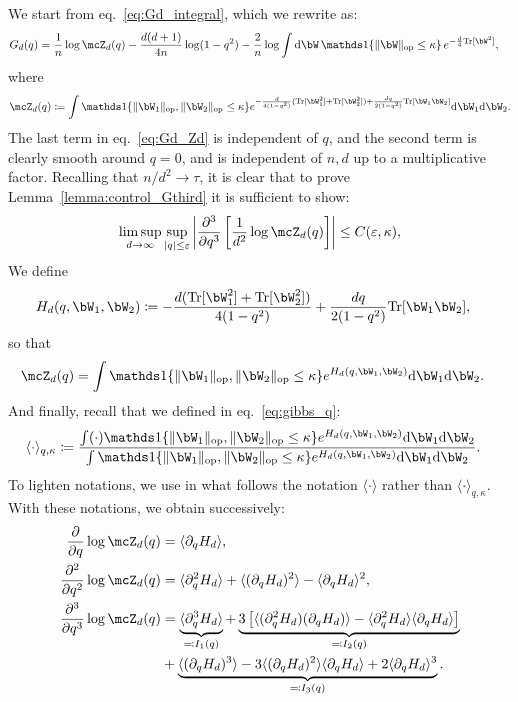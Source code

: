 We start from eq.~\eqref{eq:Gd_integral}, which we rewrite as:
\begin{align}\label{eq:Gd_Zd}
    G_d(q) &= \frac{1}{n} \log \mcZ_d(q) - \frac{d(d+1)}{4n} \log(1-q^2) - \frac{2}{n} \log \int \rd \bW \, \indi\{\|\bW \|_\op \leq \kappa\} \, e^{-\frac{d}{4}\Tr[\bW^2]},
\end{align}
where 
\begin{align}\label{eq:def_Zd}
    \mcZ_d(q) \coloneqq \int \indi\{\|\bW_1\|_\op, \|\bW_2\|_\op \leq \kappa\} e^{-\frac{d}{4(1-q^2)}(\Tr[\bW_1^2] + \Tr[\bW_2^2]) + \frac{dq}{2(1-q^2)} \Tr[\bW_1 \bW_2]} \rd \bW_1 \rd \bW_2.
\end{align}
The last term in eq.~\eqref{eq:Gd_Zd} is independent of $q$, and the second term is clearly smooth around $q = 0$, and is independent of $n,d$ up to a multiplicative factor.
Recalling that $n/d^2 \to \tau$, it is clear that to prove Lemma~\ref{lemma:control_Gthird} it is sufficient to show:
\begin{equation}\label{eq:to_show_Zd}
    \limsup_{d \to \infty} \sup_{|q| \leq \eps} \left| \frac{\partial^3}{\partial q^3}\left[ \frac{1}{d^2}\log \mcZ_d(q)\right]\right| \leq C(\eps, \kappa),
\end{equation}
We define 
\begin{align}\label{eq:def_Hd}
    H_d(q, \bW_1, \bW_2) &\coloneqq -\frac{d(\Tr[\bW_1^2] + \Tr[\bW_2^2])}{4(1-q^2)} + \frac{dq}{2(1-q^2)} \Tr[\bW_1 \bW_2],
\end{align}
so that
\begin{align*}
    \mcZ_d(q) &= \int \indi\{\|\bW_1\|_\op, \|\bW_2\|_\op \leq \kappa\} e^{H_d(q, \bW_1, \bW_2)} \rd \bW_1 \rd \bW_2.
\end{align*}
And finally, recall that we defined in eq.~\eqref{eq:gibbs_q}:
\begin{align*}
    \langle \cdot \rangle_{q,\kappa} &\coloneqq 
    \frac{\int (\cdot) \indi\{\|\bW_1\|_\op, \|\bW_2\|_\op \leq \kappa\} e^{H_d(q, \bW_1, \bW_2)} \rd \bW_1 \rd \bW_2}{\int \indi\{\|\bW_1\|_\op, \|\bW_2\|_\op \leq \kappa\} e^{H_d(q, \bW_1, \bW_2)} \rd \bW_1 \rd \bW_2}.
\end{align*}
To lighten notations, we use in what follows the notation $\langle \cdot \rangle$ rather than $\langle \cdot \rangle_{q,\kappa}$.
With these notations, we obtain successively:
\begin{align}\label{eq:d3logZ}
    \nonumber
    \frac{\partial}{\partial q}\log \mcZ_d(q) &= \langle \partial_q H_d \rangle, \\
    \nonumber
    \frac{\partial^2}{\partial q^2}\log \mcZ_d(q) &= \langle \partial^2_q H_d \rangle + \langle (\partial_q H_d)^2 \rangle - \langle \partial_q H_d \rangle^2, \\
    \frac{\partial^3}{\partial q^3}\log \mcZ_d(q) &= \underbrace{\langle \partial^3_q H_d \rangle}_{\eqqcolon I_1(q)}
    + \underbrace{3\left[\langle (\partial^2_q H_d)(\partial_q H_d) \rangle - \langle \partial^2_q H_d\rangle \langle\partial_q H_d \rangle\right]}_{\eqqcolon I_2(q)} \\
    \nonumber
    &
    + \underbrace{\langle (\partial_q H_d)^3 \rangle - 3 \langle (\partial_q H_d)^2 \rangle \langle \partial_q H_d \rangle
    + 2 \langle \partial_q H_d \rangle^3}_{\eqqcolon I_3(q)}.
\end{align}
